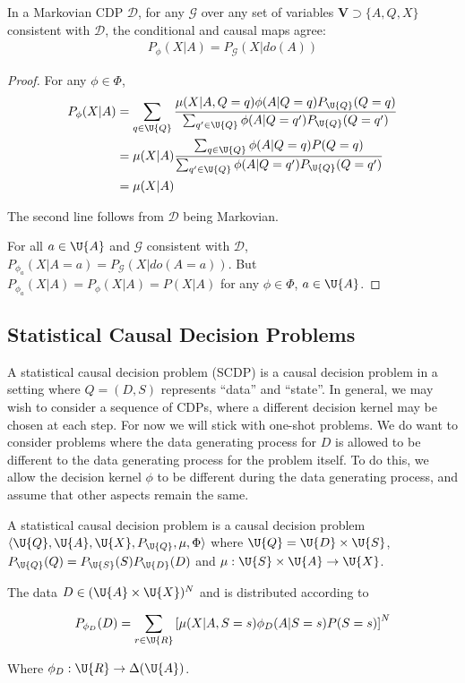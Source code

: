 \begin{theorem}
In a Markovian CDP $\mathscr{D}$, for any $\mathcal{G}$ over any set of variables $\mathbf{V}\supset \{A,Q,X\}$ consistent with $\mathscr{D}$, the conditional and causal maps agree:
\begin{align}
     P_\phi(X|A)=P_{\mathcal{G}}(X|do(A))
\end{align}
\end{theorem}

\begin{proof}

For any $\phi\in \Phi$,
\begin{align}
    P_\phi(X|A)&=\sum_{q\in\U{Q}} \frac{\mu(X|A,Q=q) \phi(A|Q=q) P_{\U{Q}}(Q=q)}{\sum_{q'\in\U{Q}} \phi(A|Q=q')P_{\U{Q}}(Q=q')}\\
               &=\mu(X|A) \frac{\sum_{q\in \U{Q}} \phi(A|Q=q) P(Q=q)}{\sum_{q'\in\U{Q}} \phi(A|Q=q')P_{\U{Q}}(Q=q')}\\
               &=\mu(X|A)
\end{align}

The second line follows from $\mathscr{D}$ being Markovian.

For all $a\in \U{A}$ and $\mathscr{G}$ consistent with $\mathscr{D}$, $P_{\phi_a}(X|A=a)=P_{\mathcal{G}}(X|do(A=a))$. But $P_{\phi_a}(X|A)=P_{\phi}(X|A)=P(X|A)$ for any $\phi\in \Phi$, $a\in\U{A}$.

\end{proof}

\subsection{Statistical Causal Decision Problems}

A statistical causal decision problem (SCDP) is a causal decision problem in a setting where $Q=(D,S)$ represents ``data'' and ``state''. In general, we may wish to consider a sequence of CDPs, where a different decision kernel may be chosen at each step. For now we will stick with one-shot problems. 
We do want to consider problems where the data generating process for $D$ is allowed to be different to the data generating process for the problem itself. To do this, we allow the decision kernel $\phi$ to be different during the data generating process, and assume that other aspects remain the same.

\begin{definition}
A statistical causal decision problem is a causal decision problem $\langle \U{Q},\U{A},\U{X}, P_{\U{Q}}, \mu, \Phi \rangle$ where $\U{Q}=\U{D}\times \U{S}$, $P_{\U{Q}}(Q)=P_{\U{S}}(S)P_{\U{D}}(D)$ and $\mu:\U{S}\times\U{A}\to \U{X}$.

The data $D\in (\U{A}\times\U{X})^{N}$ and is distributed according to

\begin{align}
    P_{\phi_D}(D) = \sum_{r\in \U{R}} \left[\mu(X|A,S=s)\phi_D(A|S=s)P(S=s)\right]^N
\end{align}

Where $\phi_D:\U{R}\to \Delta(\U{A})$.
\end{definition}

